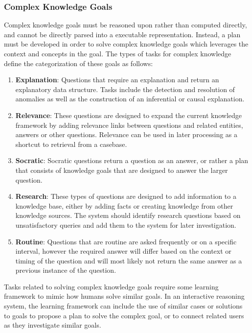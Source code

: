 \documentclass{llncs}
\begin{document}
\subsubsection{Complex Knowledge Goals}

Complex knowledge goals must be reasoned upon rather than computed directly, and cannot be directly parsed into a executable representation. Instead, a plan must be developed in order to solve complex knowledge goals which leverages the context and concepts in the goal. The types of tasks for complex knowledge define the categorization of these goals as follows:

\begin{enumerate}

\item \textbf{Explanation}: Questions that require an explanation and return an explanatory data structure. Tasks include the detection and resolution of anomalies as well as the construction of an inferential or causal explanation.

\item \textbf{Relevance}: These questions are designed to expand the current knowledge framework by adding relevance links between questions and related entities, answers or other questions. Relevance can be used in later processing as a shortcut to retrieval from a casebase.

\item \textbf{Socratic}: Socratic questions return a question as an answer, or rather a plan that consists of knowledge goals that are designed to answer the larger question.

\item \textbf{Research}: These types of questions are designed to add information to a knowledge base, either by adding facts or creating knowledge from other knowledge sources. The system should identify research questions based on unsatisfactory queries and add them to the system for later investigation.

\item \textbf{Routine}: Questions that are routine are asked frequently or on a specific interval, however the required answer will differ based on the context or timing of the question and will most likely not return the same answer as a previous instance of the question.

\end{enumerate}

Tasks related to solving complex knowledge goals require some learning framework to mimic how humans solve similar goals. In an interactive reasoning system, the learning framework can include the use of similar cases or solutions to goals to propose a plan to solve the complex goal, or to connect related users as they investigate similar goals.
\end{document}
